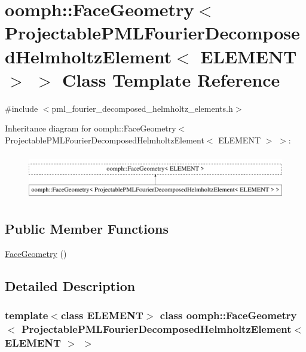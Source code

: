 \hypertarget{classoomph_1_1FaceGeometry_3_01ProjectablePMLFourierDecomposedHelmholtzElement_3_01ELEMENT_01_4_01_4}{}\section{oomph\+:\+:Face\+Geometry$<$ Projectable\+P\+M\+L\+Fourier\+Decomposed\+Helmholtz\+Element$<$ E\+L\+E\+M\+E\+NT $>$ $>$ Class Template Reference}
\label{classoomph_1_1FaceGeometry_3_01ProjectablePMLFourierDecomposedHelmholtzElement_3_01ELEMENT_01_4_01_4}


{\ttfamily \#include $<$pml\+\_\+fourier\+\_\+decomposed\+\_\+helmholtz\+\_\+elements.\+h$>$}

Inheritance diagram for oomph\+:\+:Face\+Geometry$<$ Projectable\+P\+M\+L\+Fourier\+Decomposed\+Helmholtz\+Element$<$ E\+L\+E\+M\+E\+NT $>$ $>$\+:\begin{figure}[H]
\begin{center}
\leavevmode
\includegraphics[height=2.000000cm]{classoomph_1_1FaceGeometry_3_01ProjectablePMLFourierDecomposedHelmholtzElement_3_01ELEMENT_01_4_01_4}
\end{center}
\end{figure}
\subsection*{Public Member Functions}
\begin{DoxyCompactItemize}
\item 
\hyperlink{classoomph_1_1FaceGeometry_3_01ProjectablePMLFourierDecomposedHelmholtzElement_3_01ELEMENT_01_4_01_4_ab5bbae7155c15824b21af53e68523bfe}{Face\+Geometry} ()
\end{DoxyCompactItemize}


\subsection{Detailed Description}
\subsubsection*{template$<$class E\+L\+E\+M\+E\+NT$>$\newline
class oomph\+::\+Face\+Geometry$<$ Projectable\+P\+M\+L\+Fourier\+Decomposed\+Helmholtz\+Element$<$ E\+L\+E\+M\+E\+N\+T $>$ $>$}

